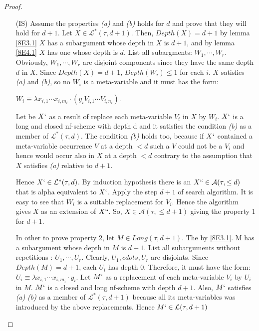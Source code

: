 \documentclass[a4paper,10pt]{article}
\begin{document}
\begin{lem}
\begin{proof}
\begin{itemize}
               \item[(IS)] Assume the properties {\em (a)} and {\em (b)} holds for $d$
                 and prove that they will hold for $d+1$. Let $X \in
                 \mathcal{L}^*(\tau,d+1)$. Then, $Depth(X) = d+1$
                 by lemma \ref{8E3.1} $X$ has a subargument whose depth in $X$
                 is $d+1$, and by lemma \ref{8E4.1} $X$ has one whose depth is
                 $d$. List all subargments: $W_1, \cdots,W_r$. 
                 Obviously, $W_1, \cdots, W_r$ are disjoint
                 components since they have the same depth $d$ in $X$.
                 Since $Depth(X) = d+1$, $Depth(W_i) \leq 1$ for each
                 $i$. $X$ satisfies {\em (a)} and {\em (b)}, so no $W_i$ is a
                 meta-variable and it must has the form:

                 $W_i \equiv \lambda x_{i,1}  \cdots {x_{i,m_i}} \cdot
                 (y_i V_{i,1} \cdots V_{i,n_i})$.

                 Let be $X`$ as a result of replace each meta-variable $V_i$
                 in $X$ by $W_i$. $X`$ is a long and closed nf-scheme
                 with depth d and it satisfies the condition {\em (b)} as a
                 member of $\mathcal{L}^*(\tau,d)$. The condition {\em (b)}
                 holds too, because if $X`$ contained a meta-variable
                 occurrence $V$ at a depth $< d$ such a $V$ could not be
                 a $V_i$ and hence would occur also in $X$ at a depth $< d$
                 contrary to the assumption that $X$ satisfies {\em (a)}
                 relative to $d+1$.

                 Hence $X` \in \mathcal{L}^*(\tau,d)$. By induction
                 hypothesis there is an $X`` \in \mathcal{A}(\tau ,\leq d)$ 
                 that is alpha equivalent to $X`$. Apply the
                 step $d+1$ of search algorithm.  It is easy to see that
                 $W_i$ is a suitable replacement for $V_i$. Hence the
                 algorithm gives $X$ as an extension of $X``$. So, $X
                 \in \mathcal{A}(\tau, \leq d+1)$ giving the property 1
                 for $d+1$.

                 In other to prove property 2, let $M \in
                 Long(\tau,d+1)$. The by \ref{8E3.1}. M has a
                 subargument whose depth in $M$ is $d+1$. List all
                 subarguments without repetitions : $U_1, \cdots,
                 U_r$. Clearly, $U_1, cdots, U_r$ are disjoints. Since
                 $Depth(M) = d+1$, each $U_i$ has depth 0. Therefore,
                 it must have the form: $U_i \equiv \lambda x_{i,1}
                 \cdots x_{i,m_i} \cdot y_i$. Let $M`$ as a
                 replacement of each meta-variable $V_i$ by $U_i$ in
                 $M$. $M`$ is a closed and long nf-scheme with depth
                 $d+1$. Also, $M`$ satisfies {\em (a)} {\em (b)} as a
                 member of $\mathcal{L}^*(\tau,d+1)$ because all its
                 meta-variables was introduced by the above
                 replacements. Hence $M` \in \mathcal{L}(\tau,d+1)$


\end{itemize}
\end{proof}
\end{lem}
\end{document}
